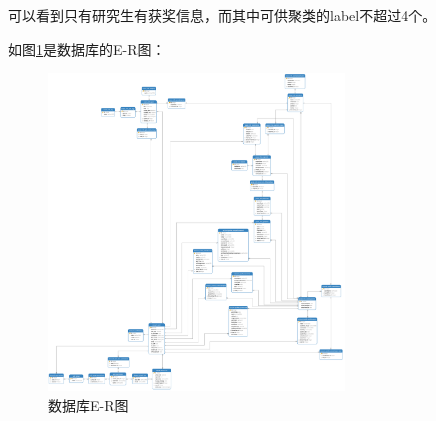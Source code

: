 可以看到只有研究生有获奖信息，而其中可供聚类的label不超过4个。

如图\ref{E-R-image}是数据库的E-R图：

\begin{figure}[htb]
  \vspace{13pt} %
  \centering
  \includegraphics[width=0.7\textwidth]{images/database-ER.png}
  \caption{数据库E-R图}\label{E-R-image} %
\end{figure}
